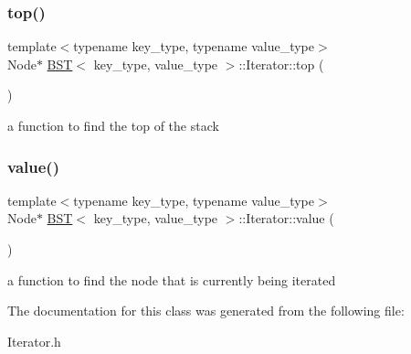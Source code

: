 \subsubsection{\texorpdfstring{top()}{top()}}
{\footnotesize\ttfamily template$<$typename key\+\_\+type, typename value\+\_\+type$>$ \\
Node$\ast$ \mbox{\hyperlink{class_b_s_t}{B\+ST}}$<$ key\+\_\+type, value\+\_\+type $>$\+::Iterator\+::top (\begin{DoxyParamCaption}{ }\end{DoxyParamCaption})\hspace{0.3cm}{\ttfamily [inline]}}

a function to find the top of the stack \mbox{\label{class_b_s_t_1_1_iterator_a51c31d4c55b51c61743eba6010df6209}} 
\subsubsection{\texorpdfstring{value()}{value()}}
{\footnotesize\ttfamily template$<$typename key\+\_\+type, typename value\+\_\+type$>$ \\
Node$\ast$ \mbox{\hyperlink{class_b_s_t}{B\+ST}}$<$ key\+\_\+type, value\+\_\+type $>$\+::Iterator\+::value (\begin{DoxyParamCaption}{ }\end{DoxyParamCaption})\hspace{0.3cm}{\ttfamily [inline]}}

a function to find the node that is currently being iterated 

The documentation for this class was generated from the following file\+:\begin{DoxyCompactItemize}
\item 
Iterator.\+h\end{DoxyCompactItemize}
